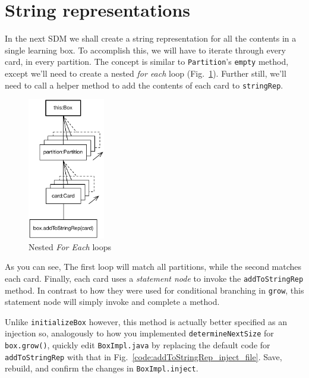 \newpage
\hypertarget{sec:stringRep}{}
\section{String representations}
\genHeader

In the next SDM we shall create a string representation for all the contents in a single learning box. To accomplish this, we will have to iterate through 
every card, in every partition. The concept is similar to \texttt{Partition}'s \texttt{empty} method, except we'll need to create a nested \emph{for each}
loop (Fig.~\ref{fig:goal_stringRep}). Further still, we'll need to call a helper method to add the contents of each card to \texttt{stringRep}.

\vspace{1cm}

\begin{figure}[htbp]
	\centering
	\includegraphics[width=0.3\textwidth]{goal_stringRep.pdf}
	\caption{Nested \emph{For Each} loops}
	\label{fig:goal_stringRep}
\end{figure}

\vspace{1cm}

As you can see, The first loop will match all partitions, while the second matches each card. Finally, each card uses a \emph{statement node} to invoke the
\texttt{addToStringRep} method. In contrast to how they were used for conditional branching in \texttt{grow}, this statement node will simply invoke and
complete a method.

Unlike \texttt{initializeBox} however, this method is actually better specified as an injection so, analogously to how you implemented
\texttt{determineNextSize} for \texttt{box.grow()}, quickly edit \texttt{BoxImpl.java} by replacing the default code for \texttt{addToStringRep} with that
in Fig.~\ref{code:addToStringRep_inject_file}. Save, rebuild, and confirm the changes in \texttt{BoxImpl.inject}.

